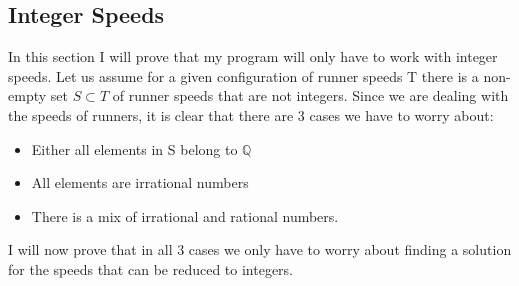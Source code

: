 \subsection{Integer Speeds}
\label{integerSpeeds}
In this section I will prove that my program will only have to work with integer speeds.
Let us assume for a given configuration of runner speeds T there is a non-empty set $S \subset T$ of runner speeds that are not integers. Since we are dealing with the speeds of runners, it is clear that there are 3 cases we have to worry about: 
\begin{itemize}
\item Either all elements in S belong to $\mathbb{Q}$
\item All elements are irrational numbers
\item There is a mix of irrational and rational numbers.
\end{itemize}

I will now prove that in all 3 cases we only have to worry about finding a solution for the speeds that can be reduced to integers.

